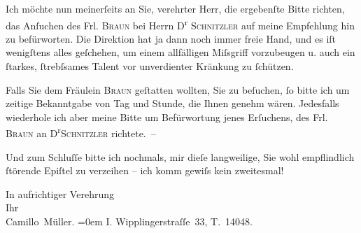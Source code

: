\pstart
           Ich möchte nun meinerſeits an Sie, verehrter Herr, die ergebenſte Bitte richten, das
                  {\pb}Anſuchen des Frl. \textsc{Braun} bei Herrn D\textsuperscript{r}{ }\textsc{Schnitzler} auf meine Empfehlung hin zu befürworten. Die
               Direktion hat ja dann noch immer freie Hand, und es iſt wenigſtens alles geſchehen,
               um einem allfälligen Miſsgriff vorzubeugen u. auch ein ſtarkes, ſtrebſsames Talent
               vor unverdienter Kränkung zu ſchützen.\pend
           
\pstart
           Falls Sie dem Fräulein \textsc{Braun} geſtatten wollten, Sie zu beſuchen, ſo bitte ich um zeitige Bekanntgabe von Tag
               und Stunde, die Ihnen {\pb}genehm
               wären. Jedesfalls wiederhole ich aber meine Bitte um Befürwortung jenes Erſuchens,
               des Frl. \textsc{Braun} an D\textsuperscript{r}\textsc{Schnitzler}
               richtete. –\pend
           
\pstart
           Und zum Schluſſe bitte ich nochmals, mir dieſe langweilige, Sie wohl empflindlich
               ſtörende Epiſtel zu verzeihen – ich komm gewiſs kein zweitesmal!\pend
           
\pstart
           In aufrichtiger Verehrung{\\[\baselineskip]}Ihr{\\[\baselineskip]}\spacefill\mbox{Camillo Müller.}\pend
           \leftskip=0em{}
\pstart
           \noindent{}I. Wipplingerstraſſe 33, T. 14048.\pend
           
\pstart
           \label{T_L01796-1v}\label{T_L01796-1}\pend
           \endnumbering{}  
      